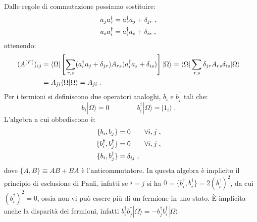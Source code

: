\documentclass[12pt,a4paper]{report}
\theoremstyle{definition}
\numberwithin{equation}{section}
\newcommand{\bra}{\langle}
\newcommand{\ket}{\rangle}
\newcommand{\adj}[1]{#1^{\dagger}}
\begin{document}
Dalle regole di commutazione possiamo sostituire:
\begin{align}
a_j\adj{a}_r &= \adj{a}_ra_j+\delta_{jr} \notag\;, \\
a_s\adj{a}_i &= \adj{a}_ia_s+\delta_{is}\;,
\end{align}
ottenendo:
\begin{align}
(A^{(F)})_{ij}&= \bra\Omega|\left[\sum_{r,s}(\adj{a}_ra_j+\delta_{jr})A_{rs}(\adj{a}_ia_s+\delta_{is})\right]|\Omega\ket=\bra\Omega|\sum_{r,s}\delta_{jr}A_{rs}\delta_{is}|\Omega\ket \notag \\
&= A_{ji}\bra\Omega|\Omega\ket=A_{ji}\;.
\end{align}
Per i fermioni si definiscono due operatori analoghi, $b_i$ e $\adj{b}_i$ tali che:
$$
b_i|\Omega\ket=0 \qquad \qquad \adj{b}_i|\Omega\ket=|1_i\ket\;.
$$
L'algebra a cui obbediscono è:
\begin{align}
\{b_i,b_j\} &= 0 \qquad \forall i,j \notag\;, \\
\{\adj{b}_i,\adj{b}_j\} &= 0 \qquad \forall i,j\notag\;, \\
\{b_i,\adj{b}_j\}&=\delta_{ij}\;,
\end{align}
dove $\{A,B\}\equiv AB+BA$ è l'anticommutatore. In questa algebra è implicito il principio di esclusione di Pauli, infatti se $i=j$ si ha $0=\{\adj{b}_i,\adj{b}_i\}=2(\adj{b}_i)^2$, da cui $(\adj{b}_i)^2=0$, ossia non vi può essere più di un fermione in uno stato. È implicita anche la disparità dei fermioni, infatti $\adj{b}_i\adj{b}_j|\Omega\ket=-\adj{b}_j\adj{b}_i|\Omega\ket$.
\end{document}
